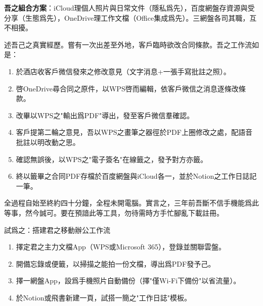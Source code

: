 \textbf{吾之組合方案}：iCloud理個人照片與日常文件（隱私爲先），百度網盤存資源與受分享（生態爲先），OneDrive理工作文檔（Office集成爲先）。三網盤各司其職，互不相擾。


述吾己之真實經歷。嘗有一次出差至外地，客戶臨時欲改合同條款。吾之工作流如是：

\begin{enumerate}
  \item 於酒店收客戶微信發來之修改意見（文字消息+一張手寫批註之照）。
  \item 啓OneDrive尋合同之原件，以WPS啓而編輯，依客戶微信之消息逐條改條款。
  \item 改畢以WPS之"輸出爲PDF"導出，發至客戶微信羣確認。
  \item 客戶提第二輪之意見，吾以WPS之畫筆之器徑於PDF上圈修改之處，配語音批註以明改動之思。
  \item 確認無誤後，以WPS之"電子簽名"在線籤之，發予對方亦籤。
  \item 終以籤畢之合同PDF存檔於百度網盤與iCloud各一，並於Notion之工作日誌記一筆。
\end{enumerate}

全過程自始至終約四十分鐘，全程未開電腦。實言之，三年前吾斷不信手機能爲此等事，然今誠可。要在預諳此等工具，勿待需時方手忙腳亂下載註冊。

\begin{tcbpractice}{試爲之：搭建君之移動辦公工作流}
\begin{enumerate}
  \item 擇定君之主力文檔App（WPS或Microsoft 365），登錄並關聯雲盤。
  \item 開備忘錄或便籤，以掃描之能拍一份文檔，導出爲PDF發予己。
  \item 擇一網盤App，設爲手機照片自動備份（擇"僅Wi-Fi下備份"以省流量）。
  \item 於Notion或飛書新建一頁，試搭一簡之"工作日誌"模板。
\end{enumerate}

\end{tcbpractice}
